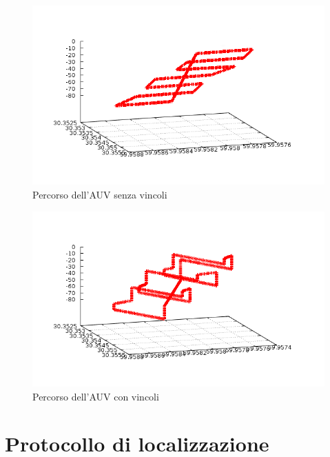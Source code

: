 \documentclass[Lau,binding=0.6cm]{sapthesis}
\begin{document}
\begin{figure}[h!]
	\includegraphics[width=\linewidth]{posizioninoscript.png}
	\caption{Percorso dell'AUV senza vincoli}
	\label{fig:}
	\centering
\end{figure}

\begin{figure}[h!]
	\includegraphics[width=\linewidth]{posizioniscript.png}
	\caption{Percorso dell'AUV con vincoli}
	\label{fig:}
	\centering
\end{figure}



\chapter{Protocollo di localizzazione}
\end{document}
